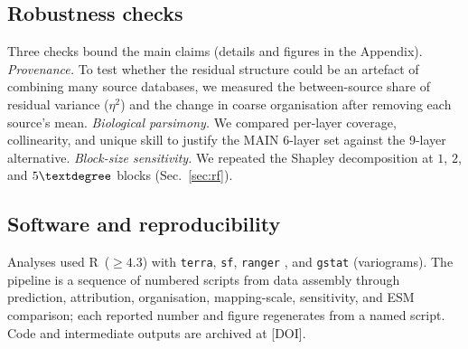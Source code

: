 \subsection{Robustness checks}
\label{sec:robust}
Three checks bound the main claims (details and figures in the Appendix).
\emph{Provenance.} To test whether the residual structure could be an artefact of
combining many source databases, we measured the between-source share of residual
variance ($\eta^2$) and the change in coarse organisation after removing each
source's mean. \emph{Biological parsimony.} We compared per-layer coverage,
collinearity, and unique skill to justify the MAIN 6-layer set against the
9-layer alternative. \emph{Block-size sensitivity.} We repeated the Shapley
decomposition at $1$, $2$, and $5\textdegree$ blocks (Sec.~\ref{sec:rf}).

\subsection{Software and reproducibility}
Analyses used R~($\geq4.3$) with \texttt{terra}, \texttt{sf}, \texttt{ranger}
\citep{Wright2017}, and \texttt{gstat} (variograms). The pipeline is a sequence of
numbered scripts from data assembly through prediction, attribution, organisation,
mapping-scale, sensitivity, and ESM comparison; each reported number and figure
regenerates from a named script. Code and intermediate outputs are archived at
[DOI].
